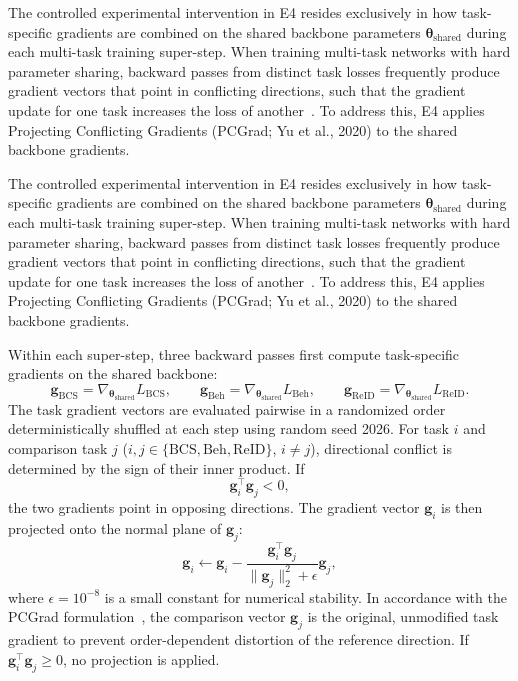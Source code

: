 The controlled experimental intervention in E4 resides exclusively in how task-specific gradients are combined on the shared backbone parameters $\boldsymbol{\theta}_{\mathrm{shared}}$ during each multi-task training super-step. When training multi-task networks with hard parameter sharing, backward passes from distinct task losses frequently produce gradient vectors that point in conflicting directions, such that the gradient update for one task increases the loss of another~\cite{yu2020pcgrad}. To address this, E4 applies Projecting Conflicting Gradients (PCGrad; Yu et al., 2020) to the shared backbone gradients.

The controlled experimental intervention in E4 resides exclusively in how task-specific gradients are combined on the shared backbone parameters $\boldsymbol{\theta}_{\mathrm{shared}}$ during each multi-task training super-step. When training multi-task networks with hard parameter sharing, backward passes from distinct task losses frequently produce gradient vectors that point in conflicting directions, such that the gradient update for one task increases the loss of another~\cite{yu2020pcgrad}. To address this, E4 applies Projecting Conflicting Gradients (PCGrad; Yu et al., 2020) to the shared backbone gradients.

Within each super-step, three backward passes first compute task-specific gradients on the shared backbone:
\begin{equation}
 \mathbf{g}_{\mathrm{BCS}} = \nabla_{\boldsymbol{\theta}_{\mathrm{shared}}} L_{\mathrm{BCS}}, \qquad
 \mathbf{g}_{\mathrm{Beh}} = \nabla_{\boldsymbol{\theta}_{\mathrm{shared}}} L_{\mathrm{Beh}}, \qquad
 \mathbf{g}_{\mathrm{ReID}} = \nabla_{\boldsymbol{\theta}_{\mathrm{shared}}} L_{\mathrm{ReID}}.
\end{equation}
The task gradient vectors are evaluated pairwise in a randomized order deterministically shuffled at each step using random seed 2026. For task $i$ and comparison task $j$ ($i, j \in \{\mathrm{BCS}, \mathrm{Beh}, \mathrm{ReID}\}$, $i \neq j$), directional conflict is determined by the sign of their inner product. If
\begin{equation}
 \mathbf{g}_i^\top \mathbf{g}_j < 0,
\end{equation}
the two gradients point in opposing directions. The gradient vector $\mathbf{g}_i$ is then projected onto the normal plane of $\mathbf{g}_j$:
\begin{equation}
 \mathbf{g}_i \leftarrow \mathbf{g}_i - \frac{\mathbf{g}_i^\top \mathbf{g}_j}{\lVert\mathbf{g}_j\rVert_2^2 + \epsilon} \mathbf{g}_j,
\end{equation}
where $\epsilon = 10^{-8}$ is a small constant for numerical stability. In accordance with the PCGrad formulation~\cite{yu2020pcgrad}, the comparison vector $\mathbf{g}_j$ is the original, unmodified task gradient to prevent order-dependent distortion of the reference direction. If $\mathbf{g}_i^\top \mathbf{g}_j \ge 0$, no projection is applied.

